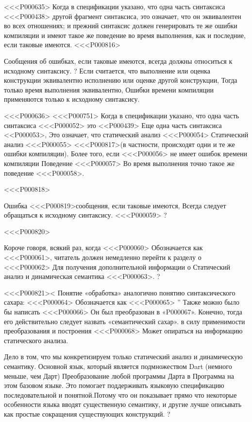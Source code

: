 {{{{{%

<<<P000635>%
Когда в спецификации указано, что одна часть синтаксиса <<<P000438>
другой фрагмент синтаксиса, это означает, что он эквивалентен во всех отношениях;
и прежний синтаксис должен генерировать те же ошибки компиляции
и имеют такое же поведение во время выполнения, как и последние, если таковые имеются.
<<<P000816>{%
Сообщения об ошибках, если таковые имеются, всегда должны относиться к исходному синтаксису.
?
Если считается, что выполнение или оценка конструкции
эквивалентно исполнению или оценке другой конструкции,
Тогда только время выполнения эквивалентно,
Ошибки времени компиляции применяются только к исходному синтаксису.

<<<P000636>%
<<<P000751>%
Когда в спецификации указано, что одна часть синтаксиса <<<P000052> это
<<P000439>
Еще одна часть синтаксиса <<P000053>,
Это означает, что статический анализ <<<P000054> Статический анализ <<<P000055>
<<<P000817>{(в частности, происходят одни и те же ошибки компиляции)}.
Более того, если <<<P000056> не имеет ошибок времени компиляции
Поведение <<<P000057> Во время выполнения точно такое же поведение <<<P000058>.

<<<P000818>{%
Ошибка <<<P000819>{сообщения}, если таковые имеются,
Всегда следует обращаться к исходному синтаксису. <<<P000059>%
?

<<<P000820>{%
Короче говоря, всякий раз, когда <<<P000060> Обозначается как <<<P000061>,
читатель должен немедленно перейти к разделу о <<<P000062>
Для получения дополнительной информации о
Статический анализ и динамическая семантика <<<P000063>.%
?

<<<P000821><%
Понятие «обработка» аналогично понятию синтаксического сахара:
<<<P000064> Обозначается как <<<P000065> ''
Также можно было бы написать
<<<P000066> Он был преобразован в «P000067».
Конечно, тогда его действительно следует назвать «семантический сахар».
в силу применимости преобразования и построения <<<P000068>
Может опираться на информацию статического анализа.

Дело в том, что мы конкретизируем только статический анализ и динамическую семантику.
Основной язык, который является подмножеством Dart
(немного меньше, чем Дарт)
Преобразование любой программы Дарта в
Программа на этом базовом языке.
Это помогает поддерживать языковую спецификацию последовательной и понятной.Потому что он показывает прямо
что некоторые особенности языка вводят существенную семантику,
и другие лучше описывать как простые сокращения существующих конструкций.
?

}}}}}}}}
